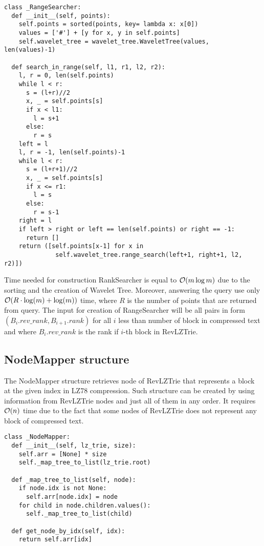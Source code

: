 \begin{verbatim}
class _RangeSearcher:
  def __init__(self, points):
    self.points = sorted(points, key= lambda x: x[0])
    values = ['#'] + [y for x, y in self.points]
    self.wavelet_tree = wavelet_tree.WaveletTree(values, len(values)-1)

  def search_in_range(self, l1, r1, l2, r2):
    l, r = 0, len(self.points)
    while l < r:
      s = (l+r)//2
      x, _ = self.points[s]
      if x < l1:
        l = s+1
      else:
        r = s
    left = l
    l, r = -1, len(self.points)-1
    while l < r:
      s = (l+r+1)//2
      x, _ = self.points[s]
      if x <= r1:
        l = s
      else:
        r = s-1
    right = l
    if left > right or left == len(self.points) or right == -1:
      return []
    return ([self.points[x-1] for x in
              self.wavelet_tree.range_search(left+1, right+1, l2, r2)])
\end{verbatim}

Time needed for construction RankSearcher is equal to $\mathcal{O}(m \log m)$ due to the sorting and the creation of Wavelet Tree. Moreover, answering the query use only $\mathcal{O}(R\cdot \log(m) + \log(m))$ time, where $R$ is the number of points that are returned from query. The input for creation of RangeSearcher will be all pairs in form $(B_i.rev\_rank, B_{i+1}.rank)$ for all $i$ less than number of block in compressed text and where $B_i.rev\_rank$ is the rank if $i$-th block in RevLZTrie.

\subsection{NodeMapper structure}
The NodeMapper structure retrieves node of RevLZTrie that represents a block at the given index in LZ78 compression. Such structure can be created by using information from RevLZTrie nodes and just all of them in any order. It requires $\mathcal{O}(n)$ time due to the fact that some nodes of RevLZTrie does not represent any block of compressed text.

\begin{verbatim}
class _NodeMapper:
  def __init__(self, lz_trie, size):
    self.arr = [None] * size
    self._map_tree_to_list(lz_trie.root)

  def _map_tree_to_list(self, node):
    if node.idx is not None:
      self.arr[node.idx] = node
    for child in node.children.values():
      self._map_tree_to_list(child)

  def get_node_by_idx(self, idx):
    return self.arr[idx]
\end{verbatim}

